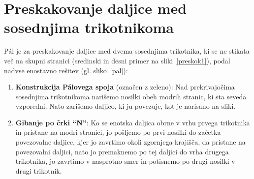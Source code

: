 \documentclass[a4paper, 12pt]{article}
\begin{document}
\section*{Preskakovanje daljice med sosednjima trikotnikoma}

Pál je za preskakovanje daljice med dvema sosednjima trikotnika, ki se ne stikata več na skupni stranici (sredinski in desni primer na sliki~\ref{preskok1}), podal nadvse enostavno rešitev (gl. sliko~\ref{pal}):

\begin{enumerate}
    \item \textbf{Konstrukcija Pálovega spoja} (označen z zeleno): Nad prekrivajočima sosednjima trikotnikoma narišemo nosilki obeh modrih stranic, ki sta seveda vzporedni. Nato zarišemo daljico, ki ju povezuje, kot je narisano na sliki.
    \item \textbf{Gibanje po črki ``N''}: Ko se enotska daljica obrne v vrhu prvega trikotnika in pristane na modri stranici, jo pošljemo po prvi nosilki do začetka povezovalne daljice, kjer jo zavrtimo okoli zgornjega krajišča, da pristane na povezovalni daljici, nato jo premaknemo po tej daljici do vrha drugega trikotnika, jo zavrtimo v nasprotno smer in potisnemo po drugi nosilki v drugi trikotnik.
\end{enumerate}
\end{document}
